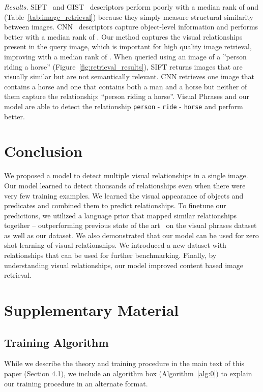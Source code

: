 \documentclass[runningheads]{llncs}
\newcommand{\relationship}[3]{\texttt{#1} - \texttt{#2} - \texttt{#3}}
\begin{document}
\textit{Results.} SIFT~\cite{lowe2004distinctive} and GIST~\cite{oliva2001modeling} descriptors perform poorly with a median rank of  and  (Table~\ref{tab:image_retrieval}) because they simply measure structural similarity between images.
CNN~\cite{simonyan2014very} descriptors capture object-level information and performs better with a median rank of .
Our method captures the visual relationships present in the query image, which is important for high quality image retrieval, improving with a median rank of . When queried using an image of a ''person riding a horse'' (Figure~\ref{fig:retrieval_results}), SIFT returns images that are visually similar but are not semantically relevant. CNN retrieves one image that contains a horse and one that contains both a man and a horse but neither of them capture the relationship: ``person riding a horse''. Visual Phrases and our model are able to detect the relationship \relationship{person}{ride}{horse} and perform better.

\section{Conclusion}
We proposed a model to detect multiple visual relationships in a single image. Our model learned to detect thousands of relationships even when there were very few training examples. We learned the visual appearance of objects and predicates and combined them to predict relationships. To finetune our predictions, we utilized a language prior that mapped similar relationships together -- outperforming previous state of the art~\cite{sadeghi2011recognition} on the visual phrases dataset~\cite{sadeghi2011recognition} as well as our dataset. We also demonstrated that our model can be used for zero shot learning of visual relationships. We introduced a new dataset with  relationships that can be used for further benchmarking. Finally, by understanding visual relationships, our model improved content based image retrieval.

\section{Supplementary Material}

\subsection{Training Algorithm}
While we describe the theory and training procedure in the main text of this paper (Section 4.1), we include an algorithm box (Algorithm~\ref{alg:0}) to explain our training procedure in an alternate format.
\end{document}
